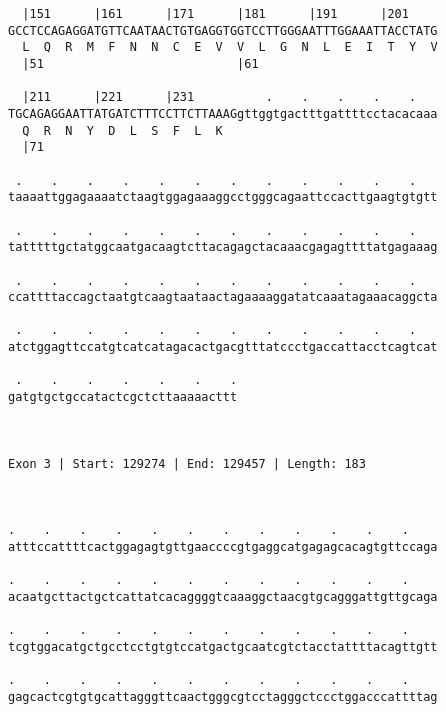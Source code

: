 \documentclass{article}
\begin{document}
\begin{Verbatim}
  |151      |161      |171      |181      |191      |201    
GCCTCCAGAGGATGTTCAATAACTGTGAGGTGGTCCTTGGGAATTTGGAAATTACCTATG
  L  Q  R  M  F  N  N  C  E  V  V  L  G  N  L  E  I  T  Y  V
  |51                           |61                         
  
  |211      |221      |231          .    .    .    .    .   
TGCAGAGGAATTATGATCTTTCCTTCTTAAAGgttggtgactttgattttcctacacaaa
  Q  R  N  Y  D  L  S  F  L  K                              
  |71                                                       
  
 .    .    .    .    .    .    .    .    .    .    .    .   
taaaattggagaaaatctaagtggagaaaggcctgggcagaattccacttgaagtgtgtt
                                                            
 .    .    .    .    .    .    .    .    .    .    .    .   
tatttttgctatggcaatgacaagtcttacagagctacaaacgagagttttatgagaaag
                                                            
 .    .    .    .    .    .    .    .    .    .    .    .   
ccattttaccagctaatgtcaagtaataactagaaaaggatatcaaatagaaacaggcta
                                                            
 .    .    .    .    .    .    .    .    .    .    .    .   
atctggagttccatgtcatcatagacactgacgtttatccctgaccattacctcagtcat
                                                            
 .    .    .    .    .    .    .
gatgtgctgccatactcgctcttaaaaacttt
                                
                                
 
Exon 3 | Start: 129274 | End: 129457 | Length: 183



.    .    .    .    .    .    .    .    .    .    .    .    
atttccattttcactggagagtgttgaaccccgtgaggcatgagagcacagtgttccaga
                                                            
.    .    .    .    .    .    .    .    .    .    .    .    
acaatgcttactgctcattatcacaggggtcaaaggctaacgtgcagggattgttgcaga
                                                            
.    .    .    .    .    .    .    .    .    .    .    .    
tcgtggacatgctgcctcctgtgtccatgactgcaatcgtctacctattttacagttgtt
                                                            
.    .    .    .    .    .    .    .    .    .    .    .    
gagcactcgtgtgcattagggttcaactgggcgtcctagggctccctggacccattttag
                                                            

\end{Verbatim}
\end{document}
